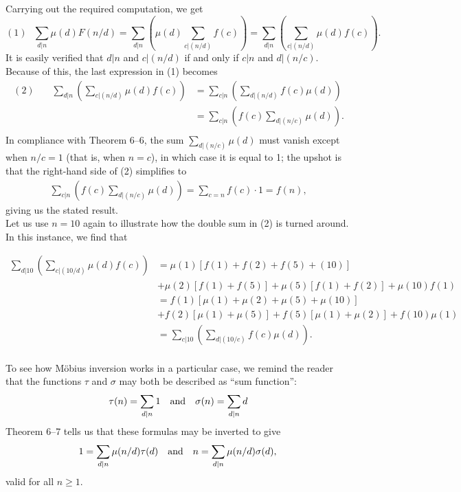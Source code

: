 \documentclass[11pt]{article}
\begin{document}
Carrying out the required computation, we get\\

$$
(1)~~~\sum_{d|n}\mu(d)F(n/d)=\sum_{d|n}\left(\mu(d)\sum_{c|(n/d)}f(c)\right)=\sum_{d|n}\left(\sum_{c|(n/d)}\mu(d)f(c)\right).
$$
It is easily verified that $d|n$ and $c|(n/d)$ if and only if $c|n$ and $d|(n/c)$. Because of this, the last expression in (1) becomes\\
\begin{align*}
(2)~~~~~~~~\sum_{d|n}\left(\sum_{c|(n/d)}\mu(d)f(c)\right)&=
\sum_{c|n}\left(\sum_{d|(n/d)}f(c)\mu(d)\right)\\
&=\sum_{c|n}\left(f(c)\sum_{d|(n/c)}\mu(d)\right).\\
\end{align*}
In compliance with Theorem 6--6, the sum $\sum_{d|(n/c)}\mu(d)$ must vanish except when $n/c=1$ (that is, when $n=c$), in which case it is equal to 1; the upshot is that the right-hand side of (2) simplifies to\\
\begin{align*}
\sum_{c|n}\left(f(c)\sum_{d|(n/c)}\mu(d)\right)=\sum_{c=n}f(c)\cdot 1=f(n),
\end{align*}
giving us the stated result.\\

Let us use $n=10$ again to illustrate how the double sum in (2) is turned around. In this instance, we find that

\begin{align*}
\sum_{d|10}\left(\sum_{c|(10/d)}\mu(d)f(c)\right)&=
\mu(1)[f(1)+f(2)+f(5)+(10)]\\
&+\mu(2)[f(1)+f(5)]+\mu(5)[f(1)+f(2)]+\mu(10)f(1)\\
&=f(1)[\mu(1)+\mu(2)+\mu(5)+\mu(10)]\\
&+f(2)[\mu(1)+\mu(5)]+f(5)[\mu(1)+\mu(2)]+f(10)\mu(1)\\
&=\sum_{c|10}\left(\sum_{d|(10/c)}f(c)\mu(d)\right).\\
\end{align*}

To see how M\"obius inversion works in a particular case, we remind the reader that the functions $\tau$ and $\sigma$ may both be described as ``sum function'':\\
$$\tau(n) = \sum \limits_{d\mid n} 1
\text{\quad and\quad}
\sigma(n) =\sum \limits_{d\mid n} d$$
Theorem 6--7 tells us that these formulas may be inverted to give\\
$$
1=\sum_{d|n}\mu(n/d)\tau(d)
\text{\quad and\quad} 
n=\sum_{d|n}\mu(n/d)\sigma(d),\\
$$
valid for all $n\ge1$.\\
\end{document}
